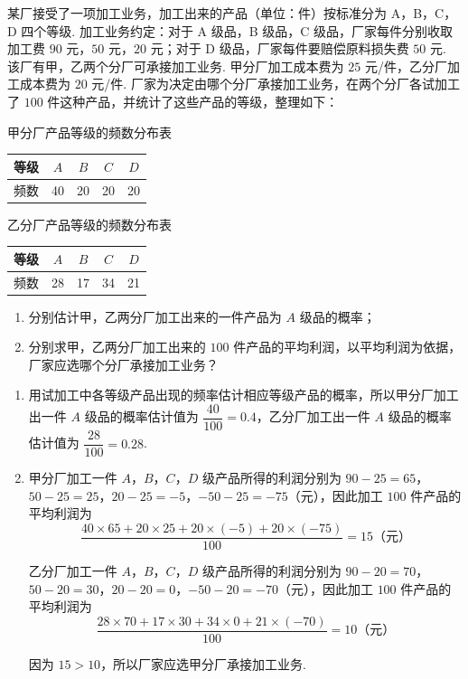 \begin{problem}
某厂接受了一项加工业务，加工出来的产品（单位：件）按标准分为 A，B，C，D 四个等级. 加工业务约定：对于 A 级品，B 级品，C 级品，厂家每件分别收取加工费 \(90\) 元，\(50\) 元，\(20\) 元；对于 D 级品，厂家每件要赔偿原料损失费 \(50\) 元. 该厂有甲，乙两个分厂可承接加工业务. 甲分厂加工成本费为 \(25\) 元/件，乙分厂加工成本费为 \(20\) 元/件. 厂家为决定由哪个分厂承接加工业务，在两个分厂各试加工了 \(100\) 件这种产品，并统计了这些产品的等级，整理如下：

\begin{center}
甲分厂产品等级的频数分布表

\begin{tabular}{c|cccc}
\hline
等级 & \(A\) & \(B\) & \(C\) & \(D\) \\
\hline
频数 & 40 & 20 & 20 & 20 \\
\hline
\end{tabular}
\end{center}

\begin{center}
乙分厂产品等级的频数分布表

\begin{tabular}{c|cccc}
\hline
等级 & \(A\) & \(B\) & \(C\) & \(D\) \\
\hline
频数 & 28 & 17 & 34 & 21 \\
\hline
\end{tabular}
\end{center}

\begin{enumerate}
\item 分别估计甲，乙两分厂加工出来的一件产品为 \(A\) 级品的概率；

\item 分别求甲，乙两分厂加工出来的 \(100\) 件产品的平均利润，以平均利润为依据，厂家应选哪个分厂承接加工业务？
\end{enumerate}
\end{problem}

\begin{solution}
\begin{enumerate}
\item 用试加工中各等级产品出现的频率估计相应等级产品的概率，所以甲分厂加工出一件 \(A\) 级品的概率估计值为
\(\dfrac{40}{100}=0.4\)，乙分厂加工出一件 \(A\) 级品的概率估计值为 \(\dfrac{28}{100}=0.28\).

\item 甲分厂加工一件 \(A\)，\(B\)，\(C\)，\(D\) 级产品所得的利润分别为
\(90-25=65\)，\(50-25=25\)，\(20-25=-5\)，\(-50-25=-75\)（元），因此加工 \(100\) 件产品的平均利润为
\[
\dfrac{40\times65+20\times25+20\times(-5)+20\times(-75)}{100}=15\text{（元）}
\]

乙分厂加工一件 \(A\)，\(B\)，\(C\)，\(D\) 级产品所得的利润分别为
\(90-20=70\)，\(50-20=30\)，\(20-20=0\)，\(-50-20=-70\)（元），因此加工 \(100\) 件产品的平均利润为
\[
\dfrac{28\times70+17\times30+34\times0+21\times(-70)}{100}=10\text{（元）}
\]

因为 \(15>10\)，所以厂家应选甲分厂承接加工业务.
\end{enumerate}
\end{solution}

